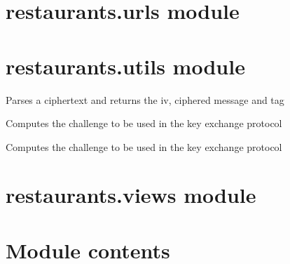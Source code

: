\documentclass[letterpaper,10pt,english]{sphinxmanual}
\begin{document}
\section{restaurants.urls module}
\label{restaurants:restaurants-urls-module}

\section{restaurants.utils module}
\label{restaurants:module-restaurants.utils}\label{restaurants:restaurants-utils-module}

\begin{fulllineitems}
\label{restaurants:restaurants.utils.parse_ct}
Parses a ciphertext and returns the iv, ciphered message and tag

\end{fulllineitems}


\begin{fulllineitems}
\label{restaurants:restaurants.utils.computeSecret}
Computes the challenge to be used in the key exchange protocol

\end{fulllineitems}


\begin{fulllineitems}
\label{restaurants:restaurants.utils.createChallenge}
Computes the challenge to be used in the key exchange protocol

\end{fulllineitems}



\section{restaurants.views module}
\label{restaurants:restaurants-views-module}

\section{Module contents}
\label{restaurants:module-restaurants}\label{restaurants:module-contents}
\end{document}

